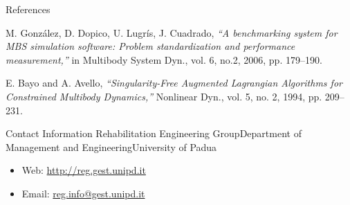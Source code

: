 \documentclass[final]{beamer}
\newlength{\onecolwid}
\begin{document}
\begin{frame}[t]
\begin{columns}[t]
\begin{column}{\onecolwid}
\begin{block}{References}
\begin{thebibliography}{99}

 M. Gonz{\'a}lez, D. Dopico, U. Lugr{\'i}s, J. Cuadrado, \textit{``A benchmarking system for MBS simulation software: Problem standardization and performance measurement,''} 	in Multibody System Dyn., vol. 6, no.2,  2006, pp. 179--190.

 E. Bayo and A. Avello, \textit{``Singularity-Free Augmented Lagrangian Algorithms for Constrained Multibody Dynamics,''} Nonlinear Dyn., vol. 5, no. 2, 1994, pp. 209--231.

\end{thebibliography}

\end{block}


\vspace{20cm}



\begin{alertblock}{Contact Information}
Rehabilitation Engineering Group\newline Department of Management and Engineering\newline University of Padua

\begin{itemize}
\item Web: \href{http://reg.gest.unipd.it}{http://reg.gest.unipd.it}
\item Email: \href{mailto:reg.info@gest.unipd.it}{reg.info@gest.unipd.it}
\end{itemize}

\end{alertblock}

\end{column} %

\end{columns} %

\end{frame} %
\end{document}
